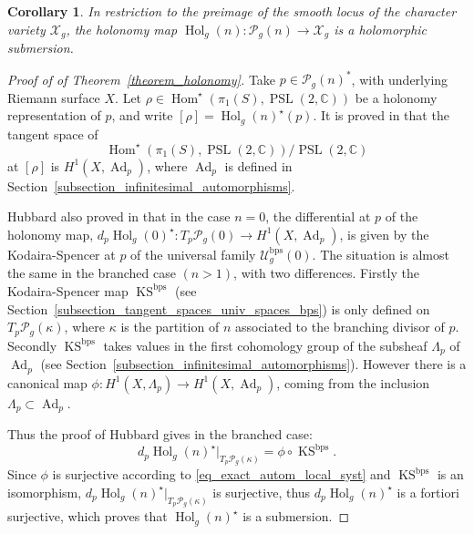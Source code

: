 \documentclass[JEP,XML,SOM,Unicode,NoEqCountersInSection,published]{cedram}
\newcommand{\C}{\mathbb C}
\newcommand{\BPS}{\mathrm{bps}}
\DeclareMathOperator{\Ad}{Ad}
\DeclareMathOperator{\Hol}{Hol}
\DeclareMathOperator{\Hom}{Hom}
\DeclareMathOperator{\KS}{KS}
\DeclareMathOperator{\PSL}{PSL}
\theoremstyle{definition}
\theoremstyle{plain}
\newtheorem{corollary}[definition]{Corollary}
\begin{document}
\begin{corollary}
In restriction to the preimage of the smooth locus of the character variety $\mathcal X_g$, the holonomy map $\Hol_g(n): \mathcal P_g(n) \to \mathcal X_g$ is a holomorphic submersion.
\end{corollary}

\begin{proof}[Proof of of Theorem~\ref{theorem_holonomy}]

Take $p \in \mathcal P_g(n)^*$, with underlying Riemann surface $X$.
Let $\rho \in \Hom^{\star}(\pi_1(S), \PSL(2, \C))$ be a holonomy representation of $p$, and write $[\rho] = \Hol_g(n)^{\star}(p)$.
It is proved in \cite{hubbard} that the tangent space of
\[
\Hom^{\star}(\pi_1(S), \PSL(2, \C))/\PSL(2, \C)
\]
at $[\rho]$ is $H^1(X, \Ad_p)$, where $\Ad_p$ is defined in Section~\ref{subsection_infinitesimal_automorphisms}.

Hubbard also proved in \cite{hubbard} that in the case $n = 0$, the differential at $p$ of the holonomy map, \ie $d_p\Hol_g(0)^{\star}: T_p \mathcal P_g(0) \to H^1(X, \Ad_p)$, is given by the Kodaira-Spencer at $p$ of the universal family $\mathcal U_g^{\BPS}(0)$.
The situation is almost the same in the branched case $(n > 1)$, with two differences. Firstly the Kodaira-Spencer map $\KS^{\BPS}$ (see Section~\ref{subsection_tangent_spaces_univ_spaces_bps}) is only defined on $T_p\mathcal P_g(\kappa)$, where $\kappa$ is the partition of $n$ associated to the branching divisor of $p$. Secondly $\KS^{\BPS}$ takes values in the first cohomology group of the subsheaf $\Lambda_p$ of $\Ad_p$ (see Section~\ref{subsection_infinitesimal_automorphisms}). However there is a canonical map $\phi: H^1(X, \Lambda_p) \to H^1(X, \Ad_p)$, coming from the inclusion $\Lambda_p \subset \Ad_p$.

Thus the proof of Hubbard gives in the branched case:
\begin{equation*}
d_p\Hol_g(n)^{\star}|_{T_p\mathcal P_g(\kappa)} = \phi \circ \KS^{\BPS}.
\end{equation*}
Since $\phi$ is surjective according to \eqref{eq_exact_autom_local_syst} and $\KS^{\BPS}$ is an isomorphism, $d_p\Hol_g(n)^{\star}|_{T_p\mathcal P_g(\kappa)}$ is surjective, thus $d_p\Hol_g(n)^{\star}$ is a fortiori surjective, which proves that $\Hol_g(n)^{\star}$ is a submersion.
\end{proof}

\backmatter


\end{document}
